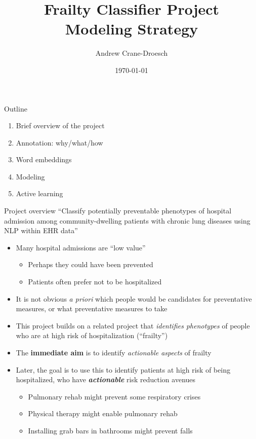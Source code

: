 \documentclass[10pt]{beamer}
\title{Frailty Classifier Project \\ Modeling Strategy}
\author{Andrew Crane-Droesch}
\date{\today}
\begin{document}
    \begin{frame}
    \titlepage
    \end{frame}


\begin{frame}{Outline}
\begin{enumerate}
\item Brief overview of the project
\item Annotation:  why/what/how
\item Word embeddings
\item Modeling
\item Active learning
\end{enumerate}
\end{frame}

\begin{frame}{Project overview}
``Classify potentially preventable phenotypes of hospital admission among community-dwelling patients with chronic lung diseases using NLP within EHR data''
\begin{itemize}
\item Many hospital admissions are ``low value''
	\begin{itemize}
	\item Perhaps they could have been prevented
	\item Patients often prefer not to be hospitalized
	\end{itemize}
\item It is not obvious \textit{a priori} which people would be candidates for preventative measures, or what preventative measures to take
\item This project builds on a related project that \textit{identifies phenotypes} of people who are at high risk of hospitalization (``frailty'')
\item The \textbf{immediate aim} is to identify \textit{actionable aspects} of frailty
\item Later, the goal is to use this to identify patients at high risk of being hospitalized, who have \textit{\textbf{actionable}} risk reduction avenues
	\begin{itemize}
	\item Pulmonary rehab might prevent some respiratory crises
	\item Physical therapy might enable pulmonary rehab
	\item Installing grab bars in bathrooms might prevent falls
	\end{itemize}
\end{itemize}
\end{frame}
\end{document}
